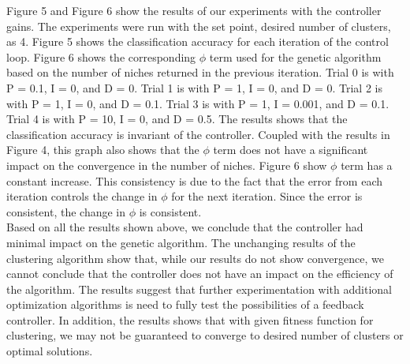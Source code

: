 \documentclass{sig-alternate}
\begin{document}
\indent Figure 5 and Figure 6 show the results of our experiments with the controller gains. The experiments were run with the set point, desired number of clusters, as 4. Figure 5 shows the classification accuracy for each iteration of the control loop. Figure 6 shows the corresponding $\phi$ term used for the genetic algorithm based on the number of niches returned in the previous iteration. Trial 0 is with P = 0.1, I = 0, and D = 0. Trial 1 is with P = 1, I = 0, and D = 0. Trial 2 is with P = 1, I = 0, and D = 0.1. Trial 3 is with P = 1, I = 0.001, and D = 0.1. Trial 4 is with P = 10, I = 0, and D = 0.5. The results shows that the classification accuracy is invariant of the controller. Coupled with the results in Figure 4, this graph also shows that the $\phi$ term does not have a significant impact on the convergence in the number of niches. Figure 6 show $\phi$ term has a constant increase. This consistency is due to the fact that the error from each iteration controls the change in $\phi$ for the next iteration. Since the error is consistent, the change in $\phi$ is consistent.\\
\indent Based on all the results shown above, we conclude that the controller had minimal impact on the genetic algorithm. The unchanging results of the clustering algorithm show that, while our results do not show convergence, we cannot conclude that the controller does not have an impact on the efficiency of the algorithm. The results suggest that further experimentation with additional optimization algorithms is need to fully test the possibilities of a feedback controller. In addition, the results shows that with given fitness function for clustering, we may not be guaranteed to converge to desired number of clusters or optimal solutions. 
\end{document}
